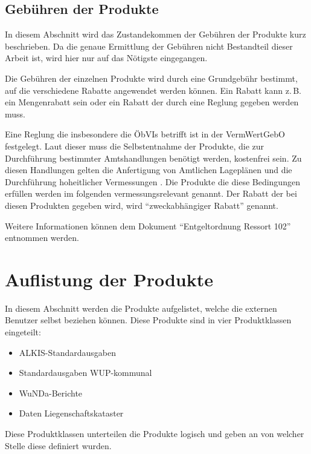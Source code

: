 \subsection{Gebühren der Produkte} \label{subsec:gebuehren}
In diesem Abschnitt wird das Zustandekommen der Gebühren der Produkte kurz beschrieben.
Da die genaue Ermittlung der Gebühren nicht Bestandteil dieser Arbeit ist, wird hier nur auf das Nötigste eingegangen. 

Die Gebühren der einzelnen Produkte wird durch eine Grundgebühr bestimmt, auf die verschiedene Rabatte angewendet werden können.
Ein Rabatt kann z.\,B. ein Mengenrabatt sein oder ein Rabatt der durch eine Reglung gegeben werden muss. 

Eine Reglung die insbesondere die \acp{ÖbVI} betrifft ist in der \ac{VermWertGebO} festgelegt.
Laut dieser muss die Selbstentnahme der Produkte, die zur Durchführung bestimmter Amtshandlungen benötigt werden, kostenfrei sein.
Zu diesen Handlungen gelten die Anfertigung von Amtlichen Lageplänen und die Durchführung hoheitlicher Vermessungen \autocite[vgl.][]{wupp-wunda-oebvi}.
Die Produkte die diese Bedingungen erfüllen werden im folgenden vermessungsrelevant genannt. Der Rabatt der bei diesen Produkten gegeben wird, wird "`zweckabhängiger Rabatt"' genannt. 

Weitere Informationen können dem Dokument "`Entgeltordnung Ressort 102"' \autocite{wupp-entgelt} entnommen werden.

\section{Auflistung der Produkte} \label{sec:produktliste}
In diesem Abschnitt werden die Produkte aufgelistet, welche die externen Benutzer selbst beziehen können. Diese Produkte sind in vier Produktklassen eingeteilt:
\begin{itemize}
	\item ALKIS-Standardausgaben
	\item Standardausgaben WUP-kommunal
	\item WuNDa-Berichte
	\item Daten Liegenschaftskataster
\end{itemize}
Diese Produktklassen unterteilen die Produkte logisch und geben an von welcher Stelle diese definiert wurden.

